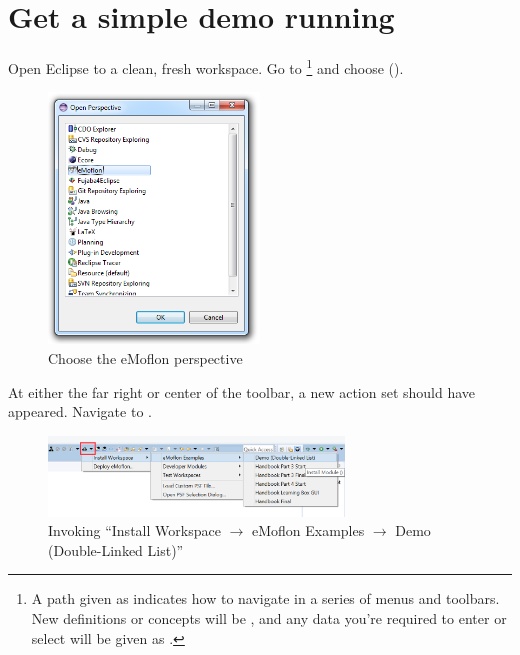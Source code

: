 \newpage
\genHeader

\chapter{Get a simple demo running}


\begin{stepbystep}
\hypertarget{simpleDemo common}{} 
\item
Open Eclipse to a clean, fresh workspace.
Go to  \footnote{A path given as  indicates how to navigate in a series of menus and toolbars.
New definitions or concepts will be , and any data you're required to enter or select will be given as .} and choose  ().

\begin{figure}[htbp]
	\centering
  \includegraphics[width=0.5\textwidth]{../../org.moflon.doc.handbook.01_installation/2_simpleDemo/sd_images/eclipse_openPerspective}
	\caption{Choose the eMoflon perspective}
	\label{eclipse:openPerspective}
\end{figure} 

\item
At either the far right or center of the toolbar, a new action set should have appeared.
Navigate to .
%
\vspace{0.5cm}
\begin{figure}[htbp]
	\centering
  \includegraphics[width= 0.7\textwidth]{../../org.moflon.doc.handbook.01_installation/2_simpleDemo/sd_images/eclipse_MoflonButton}
	\caption{Invoking \enquote{Install Workspace $\to$ eMoflon Examples $\to$ Demo (Double-Linked List)}}
	\label{eclipse:newMetamodel}
\end{figure}


\end{stepbystep}

